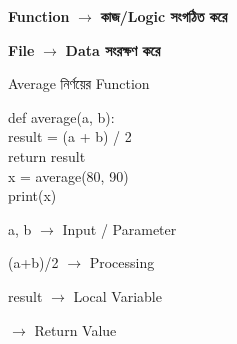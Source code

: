 \begin{center}

\textbf{Function}
\(\longrightarrow\)
\textbf{কাজ/Logic সংগঠিত করে}

\qquad

\textbf{File}
\(\longrightarrow\)
\textbf{Data সংরক্ষণ করে}

\end{center}



\begin{codeoutputbox}{Average নির্ণয়ের Function}

\noindent
\begin{minipage}[t]{0.55\linewidth}
\codeheading

\begin{english}
\ttfamily
def average(a, b):\\
\hspace*{4mm}result = (a + b) / 2\\
\hspace*{4mm}return result\\[0.5mm]
x = average(80, 90)\\
print(x)
\end{english}

\end{minipage}
\hfill
\begin{minipage}[t]{0.41\linewidth}
\outputheading

\begin{center}
\textenglish{}
\end{center}

\textenglish{\ttfamily a, b}
\(\longrightarrow\)
Input / Parameter

\medskip

\textenglish{\ttfamily (a+b)/2}
\(\longrightarrow\)
Processing

\medskip

\textenglish{\ttfamily result}
\(\longrightarrow\)
Local Variable

\medskip

\textenglish{}
\(\longrightarrow\)
Return Value

\end{minipage}

\end{codeoutputbox}

